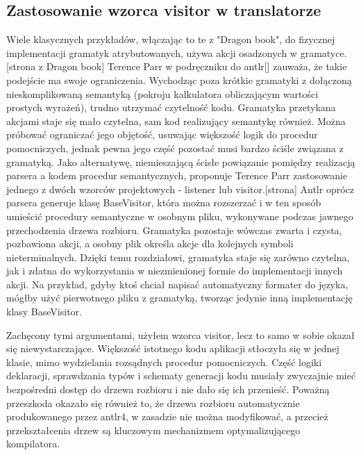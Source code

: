 \subsection{Zastosowanie wzorca visitor w translatorze}
Wiele klasycznych przykładów, włączając to te z "Dragon book", do fizycznej implementacji gramatyk atrybutowanych, używa akcji osadzonych w gramatyce.[strona z Dragon book] Terence Parr w podręczniku do antlr[] zauważa, że takie podejście ma swoje ograniczenia. Wychodząc poza krótkie gramatyki z dołączoną nieskomplikowaną semantyką (pokroju kalkulatora obliczającym wartości prostych wyrażeń), trudno utrzymać czytelność kodu. Gramatyka przetykana akcjami staje się mało czytelna, sam kod realizujący semantykę również. Można próbować ograniczać jego objętość, usuwając większość logik do procedur pomocniczych, jednak pewna jego część pozostać musi bardzo ściśle związana z gramatyką. Jako alternatywę, niemieszającą ścisłe powiązanie pomiędzy realizacją parsera a kodem procedur semantycznych, proponuje Terence Parr zastosowanie jednego z dwóch wzorców projektowych - listener lub visitor.[strona] Antlr oprócz parsera generuje klasę BaseVisitor, która można rozszerzać i w ten sposób umieścić procedury semantyczne w osobnym pliku, wykonywane podczas jawnego przechodzenia drzewa rozbioru. Gramatyka pozostaje wówczas zwarta i czysta, pozbawiona akcji, a osobny plik określa akcje dla kolejnych symboli nieterminalnych. Dzięki temu rozdziałowi, gramatyka staje się zarówno czytelna, jak i zdatna do wykorzystania w niezmienionej formie do implementacji innych akcji. Na przykład, gdyby ktoś chciał napisać automatyczny formater do języka, mógłby użyć pierwotnego pliku z gramatyką, tworząc jedynie inną implementację klasy BaseVisitor.

Zachęcony tymi argumentami, użyłem wzorca visitor, lecz to samo w sobie okazał się niewystarczające. Większość istotnego kodu aplikacji stłoczyła się w jednej klasie, mimo wydzielania rozsądnych procedur pomocniczych. Część logiki deklaracji, sprawdzania typów i schematy generacji kodu musiały zwyczajnie mieć bezpośredni dostęp do drzewa rozbioru i nie dało się ich przenieść. Poważną przeszkoda okazało się również to, że drzewa rozbioru automatycznie produkowanego przez antlr4, w zasadzie nie można modyfikować, a przecież przekształcenia drzew są kluczowym mechanizmem optymalizującego kompilatora.

